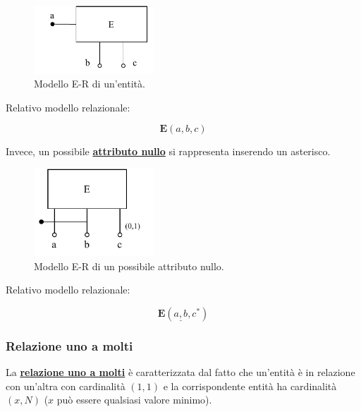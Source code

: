 \documentclass[a4paper]{article}
\begin{document}
	\begin{figure}[!htp]
		\centering
		\includegraphics[width=0.4\textwidth]{img/relazionale_entita.pdf}
		\caption{Modello E-R di un'entità.}
	\end{figure}

	\noindent
	Relativo modello relazionale:
	
	\begin{equation*}
		\textbf{E}\left(a,b,c\right)
	\end{equation*}

	\noindent
	Invece, un possibile \textcolor{Red3}{\textbf{\underline{attributo nullo}}} si rappresenta inserendo un asterisco.
	
	\begin{figure}[!htp]
		\centering
		\includegraphics[width=0.4\textwidth]{img/relazionale_attributo_nullo.pdf}
		\caption{Modello E-R di un possibile attributo nullo.}
	\end{figure}
	
	\noindent
	Relativo modello relazionale:
	
	\begin{equation*}
		\textbf{E}\left(\underline{a,b},c^{*}\right)
	\end{equation*}

	\newpage
	
	\subsubsection{Relazione uno a molti}
	
	La \textcolor{Red3}{\textbf{\underline{relazione uno a molti}}} è caratterizzata dal fatto che un'entità è in relazione con un'altra con cardinalità $\left(1,1\right)$ e la corrispondente entità ha cardinalità $\left(x,N\right)$ ($x$ può essere qualsiasi valore minimo).
	
\end{document}
